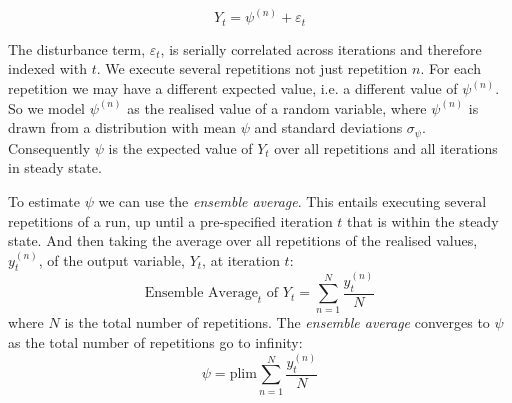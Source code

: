 \documentclass[preprint, 12pt]{elsarticle}
\begin{document}
\begin{equation}
Y_t = \psi^{(n)} + \varepsilon_t
\label{eq:process}
\end{equation}

The disturbance term, $\varepsilon_t$, is serially correlated across iterations and therefore indexed with $t$. We execute several repetitions not just repetition $n$. For each repetition we may have a different expected value, i.e. a different value of $\psi^{(n)}$. So we model $\psi^{(n)}$ as the realised value of a random variable, where $\psi^{(n)}$ is drawn from a distribution with mean $\psi$ and standard deviations $\sigma_\psi$. Consequently $\psi$ is the expected value of $Y_t$ over all repetitions and all iterations in steady state. 

To estimate $\psi$ we can use the \emph{ensemble average}. This entails executing several repetitions of a run, up until a pre-specified iteration $t$ that is within the steady state. And then taking the average over all repetitions of the realised values, $y_t^{(n)}$, of the output variable, $Y_t$, at iteration $t$:
\begin{equation}
\mbox{Ensemble Average}_t \mbox{ of } Y_t = \sum\limits_{n = 1}^N {\frac{ y_t^{(n)} }{ N }}
\end{equation}
where $N$ is the total number of repetitions. The \emph{ensemble average} converges to $\psi$ as the total number of repetitions go to infinity:
$$\psi = \mbox{plim} \sum\limits_{n = 1}^N {\frac{ y_t^{(n)} }{ N }}$$
\end{document}
